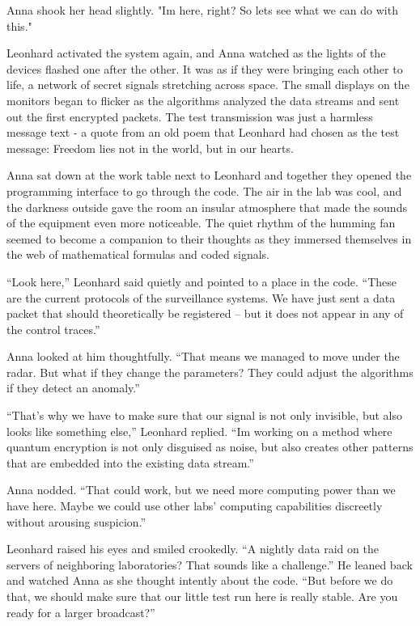 \documentclass[
]{article}
\begin{document}
Anna shook her head slightly. "I\textquotesingle m here, right? So
let\textquotesingle s see what we can do with this."

Leonhard activated the system again, and Anna watched as the lights of
the devices flashed one after the other. It was as if they were bringing
each other to life, a network of secret signals stretching across space.
The small displays on the monitors began to flicker as the algorithms
analyzed the data streams and sent out the first encrypted packets. The
test transmission was just a harmless message text - a quote from an old
poem that Leonhard had chosen as the test message: Freedom lies not in
the world, but in our hearts.

Anna sat down at the work table next to Leonhard and together they
opened the programming interface to go through the code. The air in the
lab was cool, and the darkness outside gave the room an insular
atmosphere that made the sounds of the equipment even more noticeable.
The quiet rhythm of the humming fan seemed to become a companion to
their thoughts as they immersed themselves in the web of mathematical
formulas and coded signals.

``Look here,'' Leonhard said quietly and pointed to a place in the code.
``These are the current protocols of the surveillance systems. We have
just sent a data packet that should theoretically be registered -- but
it does not appear in any of the control traces.''

Anna looked at him thoughtfully. ``That means we managed to move under
the radar. But what if they change the parameters? They could adjust the
algorithms if they detect an anomaly.''

``That's why we have to make sure that our signal is not only invisible,
but also looks like something else,'' Leonhard replied.
``I\textquotesingle m working on a method where quantum encryption is
not only disguised as noise, but also creates other patterns that are
embedded into the existing data stream.''

Anna nodded. ``That could work, but we need more computing power than we
have here. Maybe we could use other labs' computing capabilities
discreetly without arousing suspicion.''

Leonhard raised his eyes and smiled crookedly. ``A nightly data raid on
the servers of neighboring laboratories? That sounds like a challenge.''
He leaned back and watched Anna as she thought intently about the code.
``But before we do that, we should make sure that our little test run
here is really stable. Are you ready for a larger broadcast?''
\end{document}
